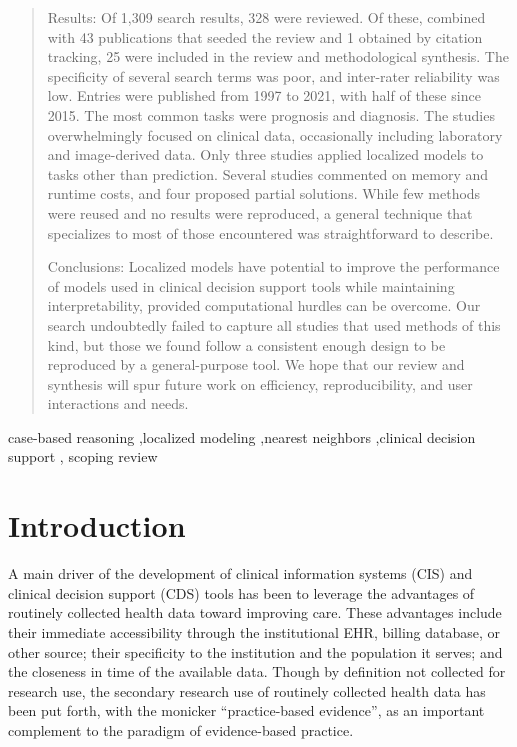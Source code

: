 \documentclass[preprint, 3p,
authoryear]{elsarticle} %
\begin{document}
\begin{frontmatter}
\begin{abstract}
  Results: Of 1,309 search results, 328 were reviewed. Of these,
  combined with 43 publications that seeded the review and 1 obtained by
  citation tracking, 25 were included in the review and methodological
  synthesis. The specificity of several search terms was poor, and
  inter-rater reliability was low. Entries were published from 1997 to
  2021, with half of these since 2015. The most common tasks were
  prognosis and diagnosis. The studies overwhelmingly focused on
  clinical data, occasionally including laboratory and image-derived
  data. Only three studies applied localized models to tasks other than
  prediction. Several studies commented on memory and runtime costs, and
  four proposed partial solutions. While few methods were reused and no
  results were reproduced, a general technique that specializes to most
  of those encountered was straightforward to describe.

  Conclusions: Localized models have potential to improve the
  performance of models used in clinical decision support tools while
  maintaining interpretability, provided computational hurdles can be
  overcome. Our search undoubtedly failed to capture all studies that
  used methods of this kind, but those we found follow a consistent
  enough design to be reproduced by a general-purpose tool. We hope that
  our review and synthesis will spur future work on efficiency,
  reproducibility, and user interactions and needs.
  \end{abstract}
    \begin{keyword}
    case-based reasoning \sep localized modeling \sep nearest
neighbors \sep clinical decision support \sep 
    scoping review
  \end{keyword}
  
 \end{frontmatter}

\hypertarget{introduction}{%
\section{Introduction}\label{introduction}}

A main driver of the development of clinical information systems (CIS)
and clinical decision support (CDS) tools has been to leverage the
advantages of routinely collected health data toward improving care.
These advantages include their immediate accessibility through the
institutional EHR, billing database, or other source; their specificity
to the institution and the population it serves; and the closeness in
time of the available data. Though by definition not collected for
research use, the secondary research use of routinely collected health
data has been put forth, with the monicker ``practice-based evidence'',
as an important complement to the paradigm of evidence-based practice.
\end{document}
